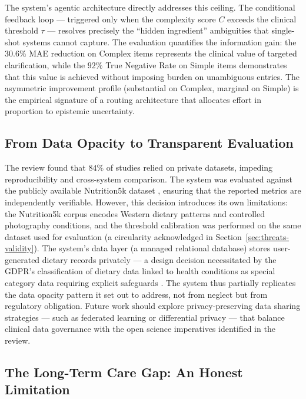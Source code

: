 The system's agentic architecture directly addresses this ceiling. The conditional feedback loop --- triggered only when the complexity score $C$ exceeds the clinical threshold $\tau$ --- resolves precisely the ``hidden ingredient'' ambiguities that single-shot systems cannot capture. The evaluation quantifies the information gain: the $30.6\%$ MAE reduction on Complex items represents the clinical value of targeted clarification, while the $92\%$ True Negative Rate on Simple items demonstrates that this value is achieved without imposing burden on unambiguous entries. The asymmetric improvement profile (substantial on Complex, marginal on Simple) is the empirical signature of a routing architecture that allocates effort in proportion to epistemic uncertainty.

\subsection{From Data Opacity to Transparent Evaluation}

The review found that $84\%$ of studies relied on private datasets, impeding reproducibility and cross-system comparison. The system was evaluated against the publicly available Nutrition5k dataset \citep{thamesNutrition5kAutomaticNutritional2021}, ensuring that the reported metrics are independently verifiable. However, this decision introduces its own limitations: the Nutrition5k corpus encodes Western dietary patterns and controlled photography conditions, and the threshold calibration was performed on the same dataset used for evaluation (a circularity acknowledged in Section~\ref{sec:threats-validity}). The system's data layer (a managed relational database) stores user-generated dietary records privately --- a design decision necessitated by the GDPR's classification of dietary data linked to health conditions as special category data requiring explicit safeguards \citep[Articles 9, 32]{europeanparliamentRegulationEU20162016}. The system thus partially replicates the data opacity pattern it set out to address, not from neglect but from regulatory obligation. Future work should explore privacy-preserving data sharing strategies --- such as federated learning or differential privacy --- that balance clinical data governance with the open science imperatives identified in the review.

\subsection{The Long-Term Care Gap: An Honest Limitation}
\label{sec:ltc-gap}

